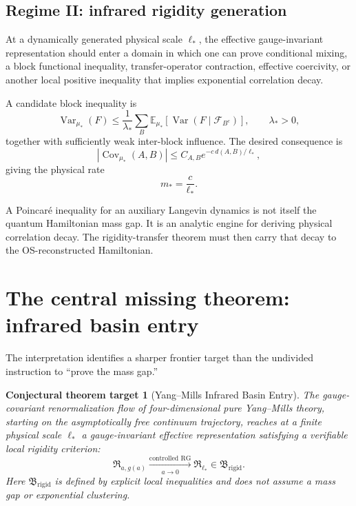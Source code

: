 \documentclass[11pt]{article}
\newtheorem{conjecture}{Conjectural theorem target}
\theoremstyle{remark}
\newcommand{\Var}{\operatorname{Var}}
\newcommand{\Cov}{\operatorname{Cov}}
\newcommand{\cF}{\mathcal{F}}
\begin{document}
\subsection{Regime II: infrared rigidity generation}

At a dynamically generated physical scale $\ell_*$, the effective
gauge-invariant representation should enter a domain in which one can prove
conditional mixing, a block functional inequality, transfer-operator
contraction, effective coercivity, or another local positive inequality that
implies exponential correlation decay.

A candidate block inequality is
\begin{equation}
  \Var_{\mu_*}(F)
  \leq
  \frac{1}{\lambda_*}
  \sum_B
  \mathbb E_{\mu_*}
  \left[
    \Var\!\left(F\mid\cF_{B^c}\right)
  \right],
  \qquad \lambda_*>0,
  \label{eq:block-poincare}
\end{equation}
together with sufficiently weak inter-block influence.  The desired consequence
is
\begin{equation}
  \left|\Cov_{\mu_*}(A,B)\right|
  \leq
  C_{A,B}
  e^{-c\,d(A,B)/\ell_*},
  \label{eq:block-clustering}
\end{equation}
giving the physical rate
\begin{equation}
  m_* = \frac{c}{\ell_*}.
  \label{eq:physical-rate}
\end{equation}

A Poincar\'e inequality for an auxiliary Langevin dynamics is not itself the
quantum Hamiltonian mass gap.  It is an analytic engine for deriving physical
correlation decay.  The rigidity-transfer theorem must then carry that decay to
the OS-reconstructed Hamiltonian.

\section{The central missing theorem: infrared basin entry}

The interpretation identifies a sharper frontier target than the undivided
instruction to ``prove the mass gap.''

\begin{conjecture}[Yang--Mills Infrared Basin Entry]
The gauge-covariant renormalization flow of four-dimensional pure Yang--Mills
theory, starting on the asymptotically free continuum trajectory, reaches at a
finite physical scale $\ell_*$ a gauge-invariant effective representation
satisfying a verifiable local rigidity criterion:
\begin{equation}
  \mathfrak R_{a,g(a)}
  \xrightarrow[\ a\to0\ ]{\text{controlled RG}}
  \mathfrak R_{\ell_*}
  \in
  \mathfrak B_{\mathrm{rigid}}.
  \label{eq:basin-entry}
\end{equation}
Here $\mathfrak B_{\mathrm{rigid}}$ is defined by explicit local inequalities
and does not assume a mass gap or exponential clustering.
\end{conjecture}
\end{document}
